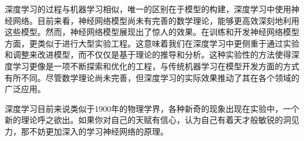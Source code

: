 深度学习的过程与机器学习相似，唯一的区别在于模型的构建，深度学习中使用神经网络。目前来看，神经网络模型尚未有完善的数学理论，能够更高效深刻地利用这些模型。然而，神经网络模型展现出了惊人的效果。在训练和开发神经网络模型方面，更类似于进行大型实验工程。这意味着我们在深度学习中更侧重于通过实验和调整来改进模型，而不仅仅是基于理论的推导和分析。这种实验性的方法使得深度学习更像是一项不断探索和优化的工程，与传统机器学习在模型开发方面的方式有所不同。尽管数学理论尚未完善，但深度学习的实际效果推动了其在各个领域的广泛应用。

深度学习目前来说类似于1900年的物理学界，各种新奇的现象出现在实验中，一个新的理论呼之欲出。如果你对自己的天赋有信心，认为自己有着天才般敏锐的洞见力，那不妨更加深入的学习神经网络的原理。